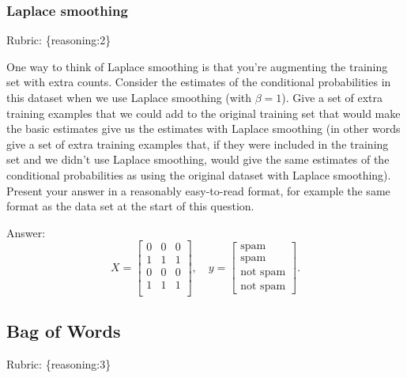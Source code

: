 \documentclass{article}
\def\rubric#1{\gre{Rubric: \{#1\}}}{}
\def\blu#1{{\color{blu}#1}}
\def\gre#1{{\color{gre}#1}}
\begin{document}
\subsubsection{Laplace smoothing}
\label{laplace.conceptual}
\rubric{reasoning:2}

One way to think of Laplace smoothing is that you're augmenting the training set with extra counts. Consider the estimates of the conditional probabilities in this dataset when we use Laplace smoothing (with $\beta = 1$).
\blu{Give a set of extra training examples that we could add to the original training set that would make the basic estimates give us the estimates with Laplace smoothing} (in other words give a set of extra training examples that, if they were included in the training set and we didn't use Laplace smoothing, would give the same estimates of the conditional probabilities as using the original dataset with Laplace smoothing).
Present your answer in a reasonably easy-to-read format, for example the same format as the data set at the start of this question.

\gre{Answer:
\[
X = \begin{bmatrix}0 & 0 & 0\\1 & 1 & 1\\ 0 & 0 & 0\\ 1 & 1 & 1\\\end{bmatrix}, \quad y = \begin{bmatrix}\text{spam}\\\text{spam}\\\text{not spam}\\\text{not spam}\end{bmatrix}.
\] }


\subsection{Bag of Words}
\rubric{reasoning:3}
\end{document}
